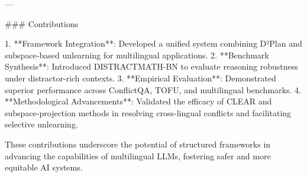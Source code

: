 ---

### Contributions  

1. **Framework Integration**: Developed a unified system combining D²Plan and subspace-based unlearning for multilingual applications.  
2. **Benchmark Synthesis**: Introduced DISTRACTMATH-BN to evaluate reasoning robustness under distractor-rich contexts.  
3. **Empirical Evaluation**: Demonstrated superior performance across ConflictQA, TOFU, and multilingual benchmarks.  
4. **Methodological Advancements**: Validated the efficacy of CLEAR and subspace-projection methods in resolving cross-lingual conflicts and facilitating selective unlearning.  

These contributions underscore the potential of structured frameworks in advancing the capabilities of multilingual LLMs, fostering safer and more equitable AI systems.